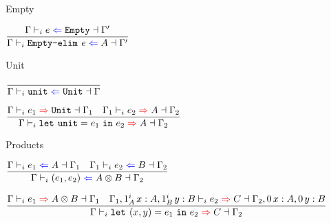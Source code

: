 \begin{frame}{Empty}

\begin{center}
  $\infrule{\checktype{\Gamma}{e}{\Empty}{\Gamma'}}{\checktype{\Gamma}{\emptyelim{e}}{A}{\Gamma'}}$
\end{center}

\end{frame}

\begin{frame}{Unit}

\begin{center}
  $\infrule{}{\checktype{\Gamma}{\unit}{\Unit}{\Gamma}}$

  \vspace{2em}

  $\infrule{\infertype{\Gamma}{e_1}{\Unit}{\Gamma_1} \quad \infertype{\Gamma_1}{e_2}{A}{\Gamma_2}}{\infertype{\Gamma}{\unitelim{e_1}{e_2}}{A}{\Gamma_2}}$
\end{center}

\end{frame}

\begin{frame}{Products}

\begin{center}
    $\infrule{\checktype{\Gamma}{e_1}{A}{\Gamma_1} \quad \checktype{\Gamma_1}{e_2}{B}{\Gamma_2}}{\checktype{\Gamma}{\pair{e_1}{e_2}}{\Prod{A}{B}}{\Gamma_2}}$

    \vspace{2em}

    $\infrule{\infertype{\Gamma}{e_1}{\Prod{A}{B}}{\Gamma_1} \quad \infertype{\extend{\extend{\Gamma_1}[\totalqty{\One}{A}]{x}{A}}[\totalqty{\One}{B}]{y}{B}}{e_2}{C}{\extend{\extend{\Gamma_2}[\Zero]{x}{A}}[\Zero]{y}{B}}}{\infertype{\Gamma}{\letpair{x}{y}{e_1}{e_2}}{C}{\Gamma_2}}$
\end{center}

\end{frame}

